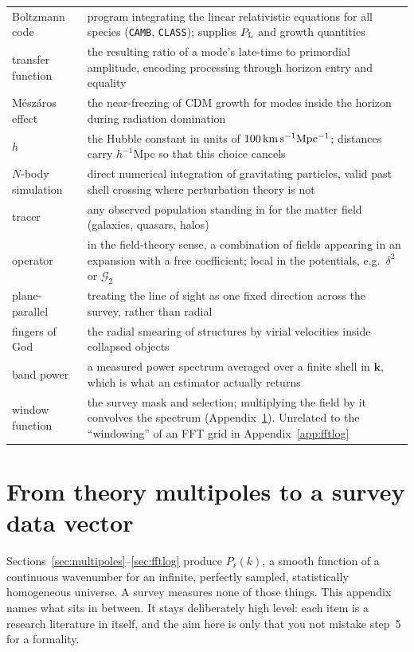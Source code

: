 \documentclass[a4paper,11pt]{article}
\newcommand{\vk}{\bm{k}}
\def\Plin{P_{\rm L}}
\def\G{\mathcal{G}}
\numberwithin{equation}{section}
\begin{document}
\begin{center}
\small
\begin{tabular}{@{}p{}p{}@{}}
\toprule
Boltzmann code & program integrating the linear relativistic equations for all species (\texttt{CAMB}, \texttt{CLASS}); supplies $\Plin$ and growth quantities \\
transfer function & the resulting ratio of a mode's late-time to primordial amplitude, encoding processing through horizon entry and equality \\
M\'esz\'aros effect & the near-freezing of CDM growth for modes inside the horizon during radiation domination \\
$h$ & the Hubble constant in units of $100\,{\rm km\,s^{-1}Mpc^{-1}}$; distances carry $h^{-1}$Mpc so that this choice cancels \\
$N$-body simulation & direct numerical integration of gravitating particles, valid past shell crossing where perturbation theory is not \\
tracer & any observed population standing in for the matter field (galaxies, quasars, halos) \\
operator & in the field-theory sense, a combination of fields appearing in an expansion with a free coefficient; local in the potentials, e.g.\ $\delta^2$ or $\G_2$ \\
plane-parallel & treating the line of sight as one fixed direction across the survey, rather than radial \\
fingers of God & the radial smearing of structures by virial velocities inside collapsed objects \\
band power & a measured power spectrum averaged over a finite shell in $\vk$, which is what an estimator actually returns \\
window function & the survey mask and selection; multiplying the field by it convolves the spectrum (Appendix~\ref{app:window}). Unrelated to the ``windowing'' of an FFT grid in Appendix~\ref{app:fftlog} \\
\bottomrule
\end{tabular}
\end{center}

\section{From theory multipoles to a survey data vector}
\label{app:window}

Sections~\ref{sec:multipoles}--\ref{sec:fftlog} produce $P_\ell(k)$, a smooth
function of a continuous wavenumber for an infinite, perfectly sampled,
statistically homogeneous universe. A survey measures none of those things. This
appendix names what sits in between. It stays deliberately high level: each item
is a research literature in itself, and the aim here is only that you not
mistake step~5 for a formality.
\end{document}
